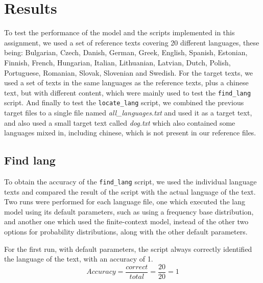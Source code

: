 \documentclass{article}
\begin{document}
\section{Results}
\label{sec:results}


To test the performance of the model and the scripts implemented in this assignment, we used a set of reference texts covering 20 different languages,
these being: Bulgarian, Czech, Danish, German, Greek, English, Spanish, Estonian, Finnish, French, Hungarian, Italian, Lithuanian, Latvian, Dutch, Polish, Portuguese, Romanian, Slovak, Slovenian and Swedish.
For the target texts, we used a set of texts in the same languages as the reference texts, plus a chinese text, but with different content, which were mainly used to test the \verb|find_lang| script.
And finally to test the \verb|locate_lang| script, we combined the previous target files to a single file named \textit{all\_languages.txt} and used it as a target text, and also used a small target text called \textit{dog.txt}
which also contained some languages mixed in, including chinese, which is not present in our reference files.

\subsection{Find lang}
\label{subsec:results_find_lang}

To obtain the accuracy of the \verb|find_lang| script, we used the individual language texts and compared the result of the script with the actual language of the text.
Two runs were performed for each language file, one which executed the lang model using its default parameters, such as using a frequency base distribution,
and another one which used the finite-context model, instead of the other two options for probability distributions, along with the other default parameters.

For the first run, with default parameters, the script always correctly identified the language of the text, with an accuracy of 1.
\begin{equation}
    \label{eq:find_lang_default_accuracy}
    Accuracy = \frac{correct}{total} = \frac{20}{20} = 1
\end{equation}
\end{document}
